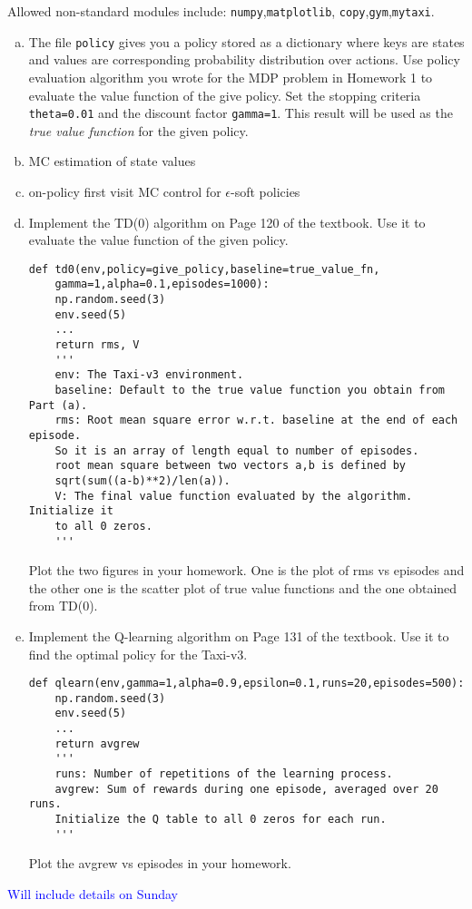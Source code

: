 Allowed non-standard modules include: \texttt{numpy},\texttt{matplotlib},
\texttt{copy},\texttt{gym},\texttt{mytaxi}.
\begin{enumerate}[(a)]
\item The file \texttt{policy} gives you a policy stored as a dictionary
where keys are states and values are corresponding probability distribution
over actions. Use policy evaluation algorithm you wrote for the MDP problem in
Homework 1 to evaluate the value function of the give policy.
Set the stopping criteria \texttt{theta=0.01} and the discount factor
\texttt{gamma=1}. This result will be used as the \emph{true value function} for
the given policy.
\item MC estimation of state values
\item on-policy first visit MC control for $\epsilon$-soft policies
\item Implement the TD(0) algorithm on Page 120 of the textbook. Use it to
evaluate the value function of the given policy.
\begin{verbatim}
def td0(env,policy=give_policy,baseline=true_value_fn,
    gamma=1,alpha=0.1,episodes=1000):
    np.random.seed(3)
    env.seed(5)
    ...
    return rms, V
    '''
    env: The Taxi-v3 environment.
    baseline: Default to the true value function you obtain from Part (a).
    rms: Root mean square error w.r.t. baseline at the end of each episode.
    So it is an array of length equal to number of episodes.
    root mean square between two vectors a,b is defined by
    sqrt(sum((a-b)**2)/len(a)).
    V: The final value function evaluated by the algorithm. Initialize it
    to all 0 zeros.
    '''
\end{verbatim}
Plot the two figures in your homework. One is the plot of rms vs episodes
and the other one is the scatter plot of true value functions and the one
obtained from TD(0).
\item Implement the Q-learning algorithm on Page 131 of the textbook. Use it
to find the optimal policy for the Taxi-v3.
\begin{verbatim}
def qlearn(env,gamma=1,alpha=0.9,epsilon=0.1,runs=20,episodes=500):
    np.random.seed(3)
    env.seed(5)
    ...
    return avgrew
    '''
    runs: Number of repetitions of the learning process.
    avgrew: Sum of rewards during one episode, averaged over 20 runs.
    Initialize the Q table to all 0 zeros for each run.
    '''
\end{verbatim}
Plot the avgrew vs episodes in your homework.
\end{enumerate}

\textcolor{blue}{Will include details on Sunday}
